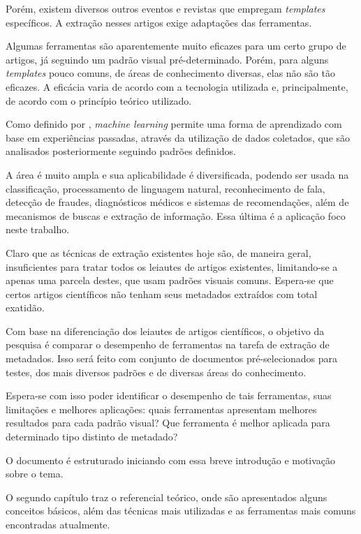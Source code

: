 Porém, existem diversos outros eventos e revistas que empregam \textit{templates} específicos. A extração nesses artigos exige adaptações das ferramentas. 

Algumas ferramentas são aparentemente muito eficazes para um certo grupo de artigos, já seguindo um padrão visual pré-determinado. Porém, para alguns \textit{templates} pouco comuns, de áreas de conhecimento diversas, elas não são tão eficazes. A eficácia varia de acordo com a tecnologia utilizada e, principalmente, de acordo com o princípio teórico utilizado.

Como definido por \cite{foundations-machine-learning}, \textit{machine learning} permite uma forma de aprendizado com base em experiências passadas, através da utilização de dados coletados, que são analisados posteriormente seguindo padrões definidos.

A área é muito ampla e sua aplicabilidade é diversificada, podendo ser usada na classificação, processamento de linguagem natural, reconhecimento de fala, detecção de fraudes, diagnósticos médicos e sistemas de recomendações, além de mecanismos de buscas e extração de informação. Essa última é a aplicação foco neste trabalho.

Claro que as técnicas de extração existentes hoje são, de maneira geral, insuficientes para tratar todos os leiautes de artigos existentes, limitando-se a apenas uma parcela destes, que usam padrões visuais comuns. Espera-se que certos artigos científicos não tenham seus metadados extraídos com total exatidão.

Com base na diferenciação dos leiautes de artigos científicos, o objetivo da pesquisa é comparar o desempenho de ferramentas na tarefa de extração de metadados. Isso será feito com conjunto de documentos pré-selecionados para testes, dos mais diversos padrões e de diversas áreas do conhecimento.

Espera-se com isso poder identificar o desempenho de tais ferramentas, suas limitações e melhores aplicações: quais ferramentas apresentam melhores resultados para cada padrão visual? Que ferramenta é melhor aplicada para determinado tipo distinto de metadado?

O documento é estruturado iniciando com essa breve introdução e motivação sobre o tema.

O segundo capítulo traz o referencial teórico, onde são apresentados alguns conceitos básicos, além das técnicas mais utilizadas e as ferramentas mais comuns encontradas atualmente.

